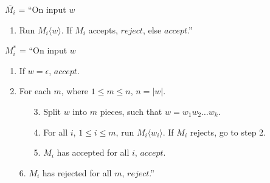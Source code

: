 \documentclass[11pt]{article}
\begin{document}
\begin{enumerate}[8.1]
    $\bar{M_i}$ = ``On input $w$
    \begin{enumerate}[label=\arabic*.]
      \item Run $M_i\langle w \rangle$. If $M_i$ accepts, $reject$, else $accept$.'' \\
    \end{enumerate}
    $M_i^*$ = ``On input $w$
    \begin{enumerate}[label=\arabic*.]
      \item If $w = \epsilon$, $accept$.
      \item For each $m$, where $1 \leq m \leq n$, $n = |w|$.
      \begin{enumerate}[label=\arabic*.]
        \item[3.] Split $w$ into $m$ pieces, such that $w = w_1w_2 \hdots w_k$.
        \item[4.] For all $i$, $1 \leq i \leq m$, run $M_i\langle w_i \rangle$. If $M_i$ rejects, go to step 2.
        \item[5.] $M_i$ has accepted for all $i$, $accept$.
      \end{enumerate}
      \item[6.] $M_i$ has rejected for all $m$, $reject$.'' \\
    \end{enumerate}
\end{enumerate}
\end{document}
